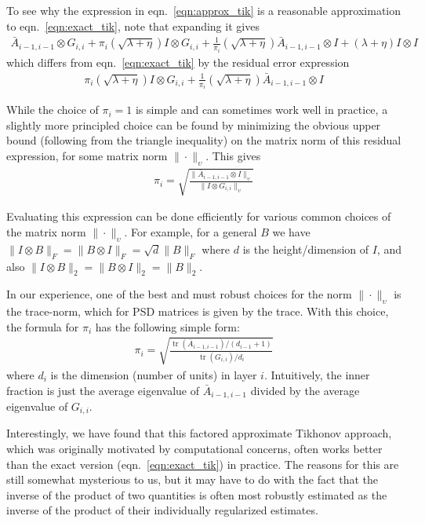 \documentclass[12pt]{article}
\DeclareMathOperator{\trace}{tr}
\begin{document}
To see why the expression in eqn.~\ref{eqn:approx_tik} is a reasonable approximation to eqn.~\ref{eqn:exact_tik}, note that expanding it gives
\begin{align*}
\bar{A}_{i-1,i-1} \otimes G_{i,i} + \pi_i (\sqrt{\lambda + \eta}) I \otimes G_{i,i} +  \frac{1}{\pi_i} (\sqrt{\lambda + \eta}) \bar{A}_{i-1,i-1} \otimes I + (\lambda + \eta) I \otimes I
\end{align*}
which differs from eqn.~\ref{eqn:exact_tik} by the residual error expression
\begin{align*}
\pi_i (\sqrt{\lambda + \eta}) I \otimes G_{i,i} +  \frac{1}{\pi_i} (\sqrt{\lambda + \eta}) \bar{A}_{i-1,i-1} \otimes I
\end{align*}

While the choice of $\pi_i = 1$ is simple and can sometimes work well in practice, a slightly more principled choice can be found by minimizing the obvious upper bound (following from the triangle inequality) on the matrix norm of this residual expression, for some matrix norm $\| \cdot \|_\upsilon$.  This gives
\begin{align*}
\pi_i = \sqrt{\frac{\|\bar{A}_{i-1,i-1} \otimes I\|_\upsilon}{\| I \otimes G_{i,i} \|_\upsilon}}
\end{align*}

Evaluating this expression can be done efficiently for various common choices of the matrix norm $\| \cdot \|_\upsilon$.  For example, for a general $B$ we have $\| I \otimes B \|_F = \| B \otimes I \|_F = \sqrt{d} \|B\|_F$ where $d$ is the height/dimension of $I$, and also $\| I \otimes B \|_2 = \| B \otimes I \|_2 = \| B \|_2$.  

In our experience, one of the best and must robust choices for the norm $\| \cdot \|_\upsilon$ is the trace-norm, which for PSD matrices is given by the trace.  With this choice, the formula for $\pi_i$ has the following simple form:
\begin{align*}
\pi_i = \sqrt{ \frac{\trace(\bar{A}_{i-1,i-1})/(d_{i-1}+1)}{\trace(G_{i,i})/d_i} }
\end{align*}
where $d_i$ is the dimension (number of units) in layer $i$.  Intuitively, the inner fraction is just the average eigenvalue of $\bar{A}_{i-1,i-1}$ divided by the average eigenvalue of $G_{i,i}$.

Interestingly, we have found that this factored approximate Tikhonov approach, which was originally motivated by computational concerns, often works better than the exact version (eqn.~\ref{eqn:exact_tik}) in practice.  The reasons for this are still somewhat mysterious to us, but it may have to do with the fact that the inverse of the product of two quantities is often most robustly estimated as the inverse of the product of their individually regularized estimates.
\end{document}
